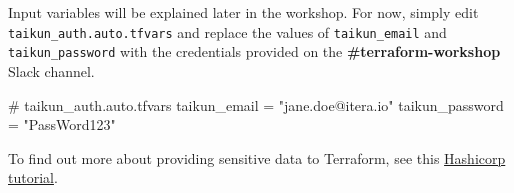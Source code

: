 Input variables will be explained later in the workshop.
For now, simply edit \texttt{taikun\_auth.auto.tfvars}
and replace the values of \texttt{taikun\_email} and \texttt{taikun\_password}
with the credentials provided on the \textbf{\#terraform-workshop} Slack channel.
\begin{tf}
# taikun_auth.auto.tfvars
taikun_email = "jane.doe@itera.io"
taikun_password = "PassWord123"
\end{tf}
To find out more about providing sensitive data to Terraform, see this \href{https://learn.hashicorp.com/tutorials/terraform/sensitive-variables}{Hashicorp tutorial}.
